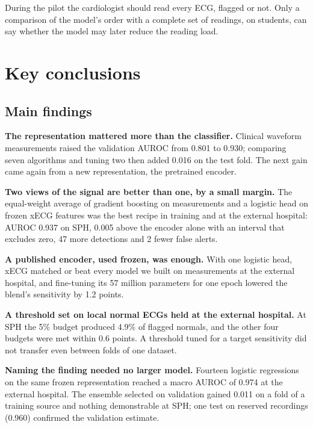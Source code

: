 \documentclass[letterpaper,11pt]{article}
\begin{document}
During the pilot the cardiologist should read every ECG, flagged or not. Only a comparison of the model's order with a complete set of readings, on students, can say whether the model may later reduce the reading load.

\section{Key conclusions}
\label{sec:conclusions}

\subsection{Main findings}

\textbf{The representation mattered more than the classifier.} Clinical waveform measurements raised the validation AUROC from 0.801 to 0.930; comparing seven algorithms and tuning two then added 0.016 on the test fold. The next gain came again from a new representation, the pretrained encoder.

\textbf{Two views of the signal are better than one, by a small margin.} The equal-weight average of gradient boosting on measurements and a logistic head on frozen xECG features was the best recipe in training and at the external hospital: AUROC 0.937 on SPH, 0.005 above the encoder alone with an interval that excludes zero, 47 more detections and 2 fewer false alerts.

\textbf{A published encoder, used frozen, was enough.} With one logistic head, xECG matched or beat every model we built on measurements at the external hospital, and fine-tuning its 57 million parameters for one epoch lowered the blend's sensitivity by 1.2 points.

\textbf{A threshold set on local normal ECGs held at the external hospital.} At SPH the 5\% budget produced 4.9\% of flagged normals, and the other four budgets were met within 0.6 points. A threshold tuned for a target sensitivity did not transfer even between folds of one dataset.

\textbf{Naming the finding needed no larger model.} Fourteen logistic regressions on the same frozen representation reached a macro AUROC of 0.974 at the external hospital. The ensemble selected on validation gained 0.011 on a fold of a training source and nothing demonstrable at SPH; one test on reserved recordings (0.960) confirmed the validation estimate.
\end{document}

